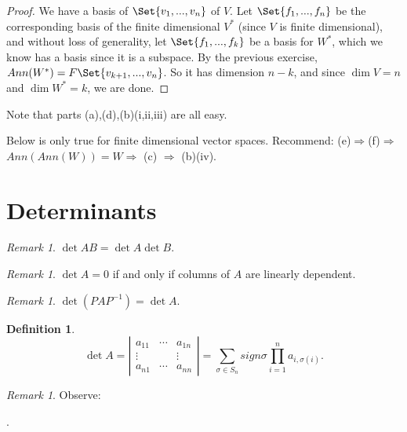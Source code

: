 \documentclass[9pt,reqno,twoside]{amsbook}
\theoremstyle{plain}
\numberwithin{section}{chapter}
\numberwithin{equation}{chapter}
\theoremstyle{definition}
\newtheorem{Def}[theorem]{Definition}
\theoremstyle{remark}
\newtheorem{rem}[theorem]{Remark}
\theoremstyle{plain}
\newcommand{\bb}{\vspace{3mm}}
\renewcommand{\phi}{\varphi}
\begin{document}
\begin{enumerate}[label=\arabic*.]
\begin{enumerate}
\begin{proof}
We have a basis of $\Set{v_1,...,v_n}$ of $V$.  Let $\Set{f_1,...,f_n}$ be the corresponding basis of the finite dimensional $V^*$ (since $V$ is finite dimensional), and without loss of generality, let $\Set{f_1,...,f_k}$ be a basis for $W^*$, which we know has a basis since it is a subspace. By the previous exercise, $Ann(W^*) = F\Set{v_{k + 1},...,v_n}$. So it has dimension $n - k$, and since $\dim V = n$ and $\dim W^* = k$, we are done. 
\end{proof}

\bb

Note that parts (a),(d),(b)(i,ii,iii) are all easy. 

Below is only true for finite dimensional vector spaces. 
Recommend: (e)$\Rightarrow$(f)$\Rightarrow$ $Ann(Ann(W)) = W \Rightarrow$ (c) $\Rightarrow$ (b)(iv). 

\end{enumerate}
\end{enumerate}

\section{Determinants}

\begin{rem}
$\det AB = \det A \det B$. 
\end{rem}

\begin{rem}
$\det A = 0$ if and only if columns of $A$ are linearly dependent. 
\end{rem}

\begin{rem}
$\det(PAP^{-1}) = \det A$. 
\end{rem}

\begin{Def}
$$
\det A = \left|\begin{matrix}
a_{11} & \cdots & a_{1n}\\
\vdots & & \vdots\\
a_{n1} & \cdots & a_{nn}
\end{matrix} \right| = \sum_{\sigma \in S_n} sign\sigma \prod_{i = 1}^n a_{i,\sigma(i)}.
$$
\end{Def}

\begin{rem}
Observe:
\begin{center}
.
\end{center}
\end{rem}
\end{document}
